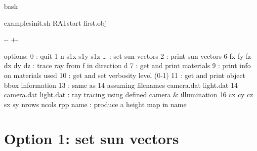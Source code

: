 \documentclass[letterpaper,10pt,english]{sphinxmanual}
\newlength\nbsphinxcodecellspacing
\begin{document}
{
\begin{sphinxVerbatim}[commandchars=\\\{\}]
\llap{\color{nbsphinxin}[3]:\,\hspace{\fboxrule}\hspace{\fboxsep}}\PYGZpc{}\PYGZpc{}bash

 examples\PYGZus{}init.sh
RATstart first.obj  
\end{sphinxVerbatim}
}

{

\kern-\sphinxverbatimsmallskipamount\kern-\baselineskip
\kern+\FrameHeightAdjust\kern-\fboxrule
\vspace{\nbsphinxcodecellspacing}

\begin{sphinxVerbatim}[commandchars=\\\{\}]
options:
         0                   : quit
         1 n s1x s1y s1z {\ldots} : set sun vectors
         2                   : print sun vectors
         6 fx fy fz dx dy dz : trace ray from f in direction d
         7                   : get and print materials
         9                   : print info on materials used
         10                  : get and set verbosity level (0-1)
         11                  : get and print object bbox information
         13                  : same as 14 assuming filenames camera.dat light.dat
         14 camera.dat light.dat
                             : ray tracing using defined camera \& illumination
         16 cx cy cz sx sy nrows ncols rpp name
                             : produce a height map in name
\end{sphinxVerbatim}
}


\section{Option 1: set sun vectors}
\label{\detokenize{RATstartOptions:Option-1:-set-sun-vectors}}
\begin{sphinxVerbatim}[commandchars=\\\{\}]
         
\end{sphinxVerbatim}
\end{document}

